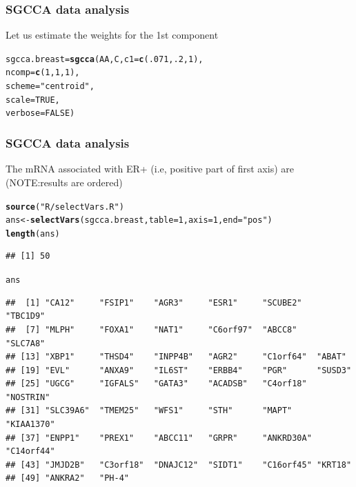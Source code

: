 \documentclass[10pt,xcolor=dvipsnames]{beamer}\usepackage[]{graphicx}\usepackage[]{color}
\makeatletter
\newcommand{\hlnum}[1]{\textcolor[rgb]{0.686,0.059,0.569}{#1}}%
\newcommand{\hlstr}[1]{\textcolor[rgb]{0.192,0.494,0.8}{#1}}%
\newcommand{\hlstd}[1]{\textcolor[rgb]{0.345,0.345,0.345}{#1}}%
\newcommand{\hlkwb}[1]{\textcolor[rgb]{0.69,0.353,0.396}{#1}}%
\newcommand{\hlkwc}[1]{\textcolor[rgb]{0.333,0.667,0.333}{#1}}%
\newcommand{\hlkwd}[1]{\textcolor[rgb]{0.737,0.353,0.396}{\textbf{#1}}}%
\newenvironment{kframe}{%
 \def\at@end@of@kframe{}%
 \ifinner\ifhmode%
  \def\at@end@of@kframe{\end{minipage}}%
  \begin{minipage}{\columnwidth}%
 \fi\fi%
 \def\FrameCommand##1{\hskip\@totalleftmargin \hskip-\fboxsep
 \colorbox{shadecolor}{##1}\hskip-\fboxsep
     \hskip-\linewidth \hskip-\@totalleftmargin \hskip\columnwidth}%
 \MakeFramed {\advance\hsize-\width
   \@totalleftmargin\z@ \linewidth\hsize
   \@setminipage}}%
 {\par\unskip\endMakeFramed%
 \at@end@of@kframe}
\newenvironment{knitrout}{}{} %
\makeatother
\begin{document}
\begin{frame}\frametitle{SGCCA data analysis}

Let us estimate the weights for the 1st component 

\begin{knitrout}\footnotesize
{}\color{fgcolor}\begin{kframe}
\begin{alltt}
\hlstd{sgcca.breast} \hlkwb{=} \hlkwd{sgcca}\hlstd{(AA, C,} \hlkwc{c1} \hlstd{=} \hlkwd{c}\hlstd{(}\hlnum{.071}\hlstd{,}\hlnum{.2}\hlstd{,} \hlnum{1}\hlstd{),}
                     \hlkwc{ncomp} \hlstd{=} \hlkwd{c}\hlstd{(}\hlnum{1}\hlstd{,} \hlnum{1}\hlstd{,} \hlnum{1}\hlstd{),}
                     \hlkwc{scheme} \hlstd{=} \hlstr{"centroid"}\hlstd{,}
                     \hlkwc{scale} \hlstd{=} \hlnum{TRUE}\hlstd{,}
                     \hlkwc{verbose} \hlstd{=} \hlnum{FALSE}\hlstd{)}
\end{alltt}
\end{kframe}
\end{knitrout}
\end{frame}



\begin{frame}\frametitle{SGCCA data analysis}

The mRNA associated with ER+ (i.e, positive part of first axis) are (NOTE:results are ordered)
\begin{knitrout}\footnotesize
{}\color{fgcolor}\begin{kframe}
\begin{alltt}
\hlkwd{source}\hlstd{(}\hlstr{"R/selectVars.R"}\hlstd{)}
\hlstd{ans} \hlkwb{<-} \hlkwd{selectVars}\hlstd{(sgcca.breast,} \hlkwc{table}\hlstd{=}\hlnum{1}\hlstd{,} \hlkwc{axis}\hlstd{=}\hlnum{1}\hlstd{,} \hlkwc{end}\hlstd{=}\hlstr{"pos"}\hlstd{)}
\hlkwd{length}\hlstd{(ans)}
\end{alltt}
\begin{verbatim}
## [1] 50
\end{verbatim}
\begin{alltt}
\hlstd{ans}
\end{alltt}
\begin{verbatim}
##  [1] "CA12"     "FSIP1"    "AGR3"     "ESR1"     "SCUBE2"   "TBC1D9"  
##  [7] "MLPH"     "FOXA1"    "NAT1"     "C6orf97"  "ABCC8"    "SLC7A8"  
## [13] "XBP1"     "THSD4"    "INPP4B"   "AGR2"     "C1orf64"  "ABAT"    
## [19] "EVL"      "ANXA9"    "IL6ST"    "ERBB4"    "PGR"      "SUSD3"   
## [25] "UGCG"     "IGFALS"   "GATA3"    "ACADSB"   "C4orf18"  "NOSTRIN" 
## [31] "SLC39A6"  "TMEM25"   "WFS1"     "STH"      "MAPT"     "KIAA1370"
## [37] "ENPP1"    "PREX1"    "ABCC11"   "GRPR"     "ANKRD30A" "C14orf44"
## [43] "JMJD2B"   "C3orf18"  "DNAJC12"  "SIDT1"    "C16orf45" "KRT18"   
## [49] "ANKRA2"   "PH-4"
\end{verbatim}
\end{kframe}
\end{knitrout}

\end{frame}
\end{document}

